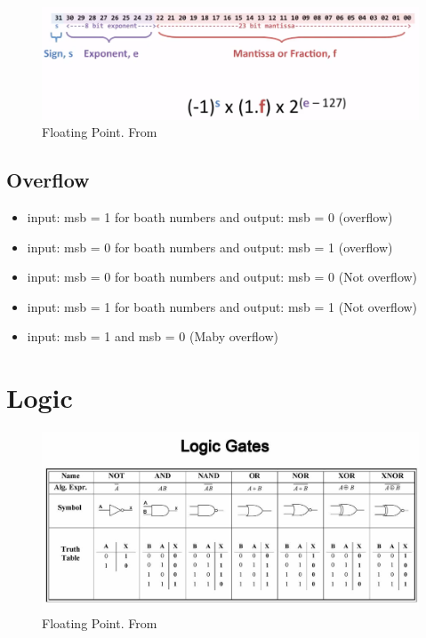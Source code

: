 \begin{figure}[H]
    \centering
    \includegraphics[width=16cm]{image/floating-point.png} 
    \caption{Floating Point. From \cite{ca}}
    \label{floating-point}
\end{figure}

\subsection{Overflow}
\begin{itemize}
\item  input: msb = 1 for boath numbers and output: msb = 0 (overflow)
\item  input: msb = 0 for boath numbers and output: msb = 1 (overflow)
\item  input: msb = 0 for boath numbers and output: msb = 0 (Not overflow)
\item  input: msb = 1 for boath numbers and output: msb = 1 (Not overflow)
\item  input: msb = 1 and msb = 0 (Maby overflow)
\end{itemize}


\section{Logic}

\begin{figure}[H]
    \centering
    \includegraphics[width=16cm]{image/logic-gates.jpeg} 
    \caption{Floating Point. From \cite{ca}}
    \label{logic-gates}
\end{figure}

